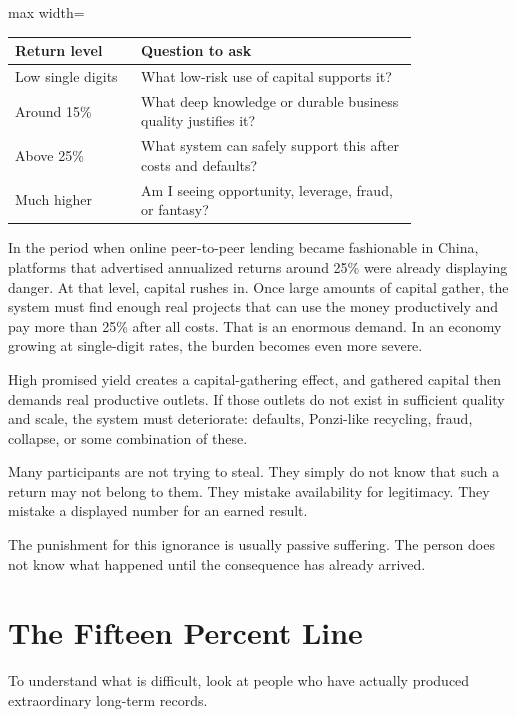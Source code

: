 \begin{center}
\begin{adjustbox}{max width=\linewidth}
\begin{tabular}{p{0.25\linewidth}p{0.55\linewidth}}
\hline
Return level & Question to ask \\
\hline
Low single digits & What low-risk use of capital supports it? \\
Around 15\% & What deep knowledge or durable business quality justifies it? \\
Above 25\% & What system can safely support this after costs and defaults? \\
Much higher & Am I seeing opportunity, leverage, fraud, or fantasy? \\
\hline
\end{tabular}
\end{adjustbox}
\end{center}

In the period when online peer-to-peer lending became fashionable in China, platforms that advertised annualized returns around 25\% were already displaying danger. At that level, capital rushes in. Once large amounts of capital gather, the system must find enough real projects that can use the money productively and pay more than 25\% after all costs. That is an enormous demand. In an economy growing at single-digit rates, the burden becomes even more severe.

High promised yield creates a capital-gathering effect, and gathered capital then demands real productive outlets. If those outlets do not exist in sufficient quality and scale, the system must deteriorate: defaults, Ponzi-like recycling, fraud, collapse, or some combination of these.

Many participants are not trying to steal. They simply do not know that such a return may not belong to them. They mistake availability for legitimacy. They mistake a displayed number for an earned result.

The punishment for this ignorance is usually passive suffering. The person does not know what happened until the consequence has already arrived.

\section*{The Fifteen Percent Line}

To understand what is difficult, look at people who have actually produced extraordinary long-term records.

